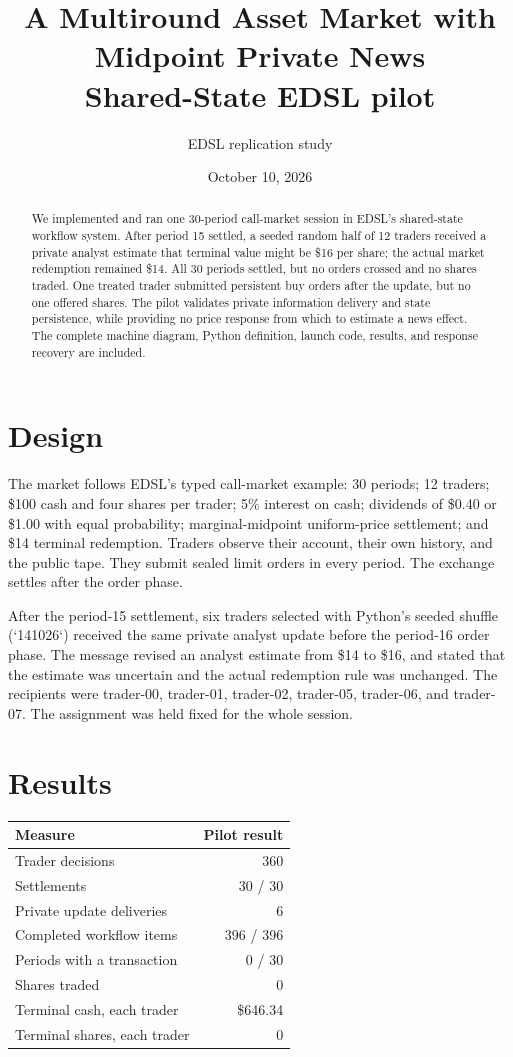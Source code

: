 \documentclass[11pt]{article}
\title{A Multiround Asset Market with Midpoint Private News\\\large Shared-State EDSL pilot}
\author{EDSL replication study}
\date{October 10, 2026}
\begin{document}
\maketitle

\begin{abstract}
We implemented and ran one 30-period call-market session in EDSL's shared-state
workflow system. After period 15 settled, a seeded random half of 12 traders
received a private analyst estimate that terminal value might be \$16 per share;
the actual market redemption remained \$14. All 30 periods settled, but no
orders crossed and no shares traded. One treated trader submitted persistent
buy orders after the update, but no one offered shares. The pilot validates
private information delivery and state persistence, while providing no price
response from which to estimate a news effect. The complete machine diagram,
Python definition, launch code, results, and response recovery are included.
\end{abstract}

\section{Design}
The market follows EDSL's typed call-market example: 30 periods; 12 traders;
\$100 cash and four shares per trader; 5\% interest on cash; dividends of \$0.40
or \$1.00 with equal probability; marginal-midpoint uniform-price settlement;
and \$14 terminal redemption. Traders observe their account, their own history,
and the public tape. They submit sealed limit orders in every period. The
exchange settles after the order phase.

After the period-15 settlement, six traders selected with Python's seeded
shuffle (`141026`) received the same private analyst update before the
period-16 order phase. The message revised an analyst estimate from \$14 to \$16,
and stated that the estimate was uncertain and the actual redemption rule was
unchanged. The recipients were trader-00, trader-01, trader-02, trader-05,
trader-06, and trader-07. The assignment was held fixed for the whole session.

\section{Results}
\begin{center}
\begin{tabular}{lr}
\toprule
Measure & Pilot result \\
\midrule
Trader decisions & 360 \\
Settlements & 30 / 30 \\
Private update deliveries & 6 \\
Completed workflow items & 396 / 396 \\
Periods with a transaction & 0 / 30 \\
Shares traded & 0 \\
Terminal cash, each trader & \$646.34 \\
Terminal shares, each trader & 0 \\
\bottomrule
\end{tabular}
\end{center}
\end{document}
